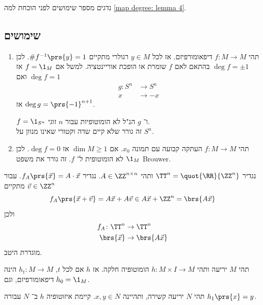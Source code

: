 \documentclass[a4paper,10pt,twoside,openany]{book}
\begin{document}
נדגים מספר שימושים לפני הוכחת למה
\ref{map degree: lemma 4}.

\subsection{שימושים}
\begin{enumerate}
\item תהי
$f \colon M \to M$
דיפאומורפיזם. אז לכל
$y \in M$
רגולרי מתקיים
$\# f^{-1}\prs{y} = 1$.
לכן
$\deg f = \pm 1$
בהתאם לאם
$f$
שומרת או הופכת אוריינטציה.
למשל
אם
$f = \1_M$
אז
$\deg f = 1$
ואם
\begin{align*}
g \colon S^n &\to S^n \\
x &\to -x
\end{align*}
אז
$\deg g = \prs{-1}^{n+1}$.

\begin{corollary}
$f = \1_{S^n}$
ו־%
$g$
הנ"ל לא הומוטופיות עבור
$n$
זוגי.
\\
זה גורר שלא קיים שדה וקטורי שאינו מנוון על
$S^n$.
\end{corollary}

\item
תהי
$f \colon M \to M$
העתקה קבועה עם תמונה
$x_0$.
אם
$\dim M \geq 1$
אז 
$\deg f = 0$.
לכן
$\1_M$
לא הומוטופית ל־%
$f$.
זה גורר את משפט
\textenglish{Brouwer}.
\end{enumerate}

\begin{exercise}
נגדיר
$\TT^n = \quot{\RR}{\ZZ^n}$
ותהי
$A \in \ZZ^{n\times n}$.
נגדיר
$f_A \prs{\vec{x}} = A \cdot \vec{x}$.
עבור
$\vec{v} \in \ZZ^n$
מתקיים
\[f_A\prs{\vec{x} + \vec{v}} = A\vec{x} + A\vec{v} \in A\vec{x} + \ZZ^n = \brs{A \vec{x}}\]
ולכן
\begin{align*}
f_A \colon \TT^n &\to \TT^n \\
\brs{\vec{x}} &\to \brs{A\vec{x}}
\end{align*}
מוגדרת היטב.
\end{exercise}

\begin{definition}
תהי
$M$
יריעה ותהי
$h \colon M \times I \to M$
הומוטופיה חלקה.
אז
$h$
אם לכל
$t$,
$h_t \colon M \to M$
הינה דיפאומורפיזם, וגם
$h_0 = \1_M$.
\end{definition}
\begin{proposition} \label{map degree: isotopy between points}
תהי
$N$
יריעה קשירה, ותהיינה
$x,y \in N$.
קיימת איזוטופיה
$h$
ב־%
$N$
עבורה
$h_1\prs{x} = y$.
\end{proposition}
\end{document}
